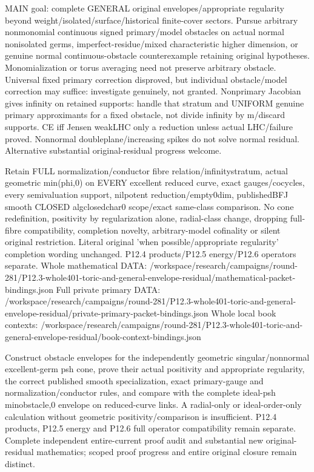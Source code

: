 \documentclass[11pt]{article}
\begin{document}
\begin{OriginalTaskDATA}
MAIN goal: complete GENERAL original envelopes/appropriate regularity beyond weight/isolated/surface/historical finite-cover sectors. Pursue arbitrary nonmonomial continuous signed primary/model obstacles on actual normal nonisolated germs, imperfect-residue/mixed characteristic higher dimension, or genuine normal continuous-obstacle counterexample retaining original hypotheses. Monomialization or torus averaging need not preserve arbitrary obstacle. Universal fixed primary correction disproved, but individual obstacle/model correction may suffice: investigate genuinely, not granted. Nonprimary Jacobian gives infinity on retained supports: handle that stratum and UNIFORM genuine primary approximants for a fixed obstacle, not divide infinity by m/discard supports. CE iff Jensen weakLHC only a reduction unless actual LHC/failure proved. Nonnormal doubleplane/increasing spikes do not solve normal residual. Alternative substantial original-residual progress welcome.

Retain FULL normalization/conductor fibre relation/infinitystratum, actual geometric min(phi,0) on EVERY excellent reduced curve, exact gauges/cocycles, every semivaluation support, nilpotent reduction/empty0dim, publishedBFJ smooth CLOSED algclosedchar0 scope/exact same-class comparison. No cone redefinition, positivity by regularization alone, radial-class change, dropping full-fibre compatibility, completion novelty, arbitrary-model cofinality or silent original restriction. Literal original 'when possible/appropriate regularity' completion wording unchanged. P12.4 products/P12.5 energy/P12.6 operators separate.
Whole mathematical DATA: /workspace/research/campaigns/round-281/P12.3-whole401-toric-and-general-envelope-residual/mathematical-packet-bindings.json
Full private primary DATA: /workspace/research/campaigns/round-281/P12.3-whole401-toric-and-general-envelope-residual/private-primary-packet-bindings.json
Whole local book contexts: /workspace/research/campaigns/round-281/P12.3-whole401-toric-and-general-envelope-residual/book-context-bindings.json

Construct obstacle envelopes for the independently geometric singular/nonnormal excellent-germ psh cone, prove their actual positivity and appropriate regularity, the correct published smooth specialization, exact primary-gauge and normalization/conductor rules, and compare with the complete ideal-psh min{obstacle,0} envelope on reduced-curve links. A radial-only or ideal-order-only calculation without geometric positivity/comparison is insufficient. P12.4 products, P12.5 energy and P12.6 full operator compatibility remain separate.
Complete independent entire-current proof audit and substantial new original-residual mathematics; scoped proof progress and entire original closure remain distinct.
\end{OriginalTaskDATA}
\end{document}
